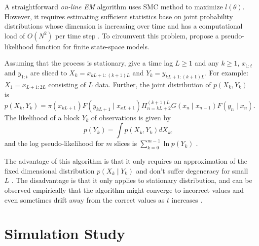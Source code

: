 A straightforward \textit{on-line EM} algorithm uses SMC method to maximize $l(\theta)$. However, it requires estimating sufficient statistics base on joint probability distributions whose dimension is increasing over time and has a computational load of $\mathit{O}(N^2)$ per time step \citep{kantas2009overview}.  To circumvent this problem, \cite{andrieu2005line} propose a pseudo-likelihood function for finite state-space models. 

Assuming that the process is stationary, give a time lag $L\geq 1$ and any $k\geq 1$, $x_{1:t}$ and $y_{1:t}$ are sliced to $X_k= x_{kL+1:(k+1)L}$ and $Y_k=  y_{kL+1:(k+1)L}$. For example: $X_1= x_{L+1:2L}$ consisting of $L$ data. Further, the joint distribution of $p(X_k,Y_k)$ is 
\begin{equation}
p(X_k,Y_k) = \pi(x_{kL+1})F(y_{kL+1}\mid x_{xL+1})\Pi_{n=kL+2}^{(k+1)L}G(x_n\mid x_{n-1})F(y_n\mid x_n). 
\end{equation}
The likelihood of a block $Y_k$ of observations is given by 
\begin{equation}
p(Y_k) = \int p\left(X_k,Y_k\right)dX_k,
\end{equation}
and the log pseudo-likelihood for $m$ slices is $\sum_{k=0}^{m-1}\ln p(Y_k)$  \citep{andrieu2005line}.


The advantage of this algorithm is that it only requires an approximation of the fixed dimensional distribution $p(X_k\mid Y_k)$ and don't suffer degeneracy for small $L$ \citep{kantas2009overview}. The disadvantage is that it only applies to stationary distribution, and can be observed empirically that the algorithm might converge to incorrect values and even sometimes drift away from the correct values as $t$ increases \citep{andrieu2010particle}.  




\section{Simulation Study}\label{sectionFilterreviewSimulation}



